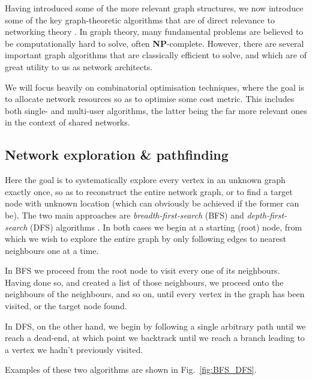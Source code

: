 \documentclass[aps,rmp,twocolumn,amsmath,amssymb,nofootinbib,superscriptaddress,longbibliography,floatfix,table-of-contents,eqsecnum]{revtex4-1}
\begin{document}
Having introduced some of the more relevant graph structures, we now introduce some of the key graph-theoretic algorithms that are of direct relevance to networking theory \cite{bib:RivestAlgBook}. In graph theory, many fundamental problems are believed to be computationally hard to solve, often \textbf{NP}-complete. However, there are several important graph algorithms that are classically efficient to solve, and which are of great utility to us as network architects.

We will focus heavily on combinatorial optimisation techniques, where the goal is to allocate network resources so as to optimise some cost metric. This includes both single- and multi-user algorithms, the latter being the far more relevant ones in the context of shared networks.

%
%

\subsection{Network exploration \& pathfinding} \label{sec:path_exp} 

Here the goal is to systematically explore every vertex in an unknown graph exactly once, so as to reconstruct the entire network graph, or to find a target node with unknown location (which can obviously be achieved if the former can be). The two main approaches are \textit{breadth-first-search} (BFS) and \textit{depth-first-search} (DFS) algorithms . In both cases we begin at a starting (root) node, from which we wish to explore the entire graph by only following edges to nearest neighbours one at a time.

In BFS we proceed from the root node to visit every one of its neighbours. Having done so, and created a list of those neighbours, we proceed onto the neighbours of the neighbours, and so on, until every vertex in the graph has been visited, or the target node found.

In DFS, on the other hand, we begin by following a single arbitrary path until we reach a dead-end, at which point we backtrack until we reach a branch leading to a vertex we hadn't previously visited.

Examples of these two algorithms are shown in Fig.~\ref{fig:BFS_DFS}.
\end{document}

